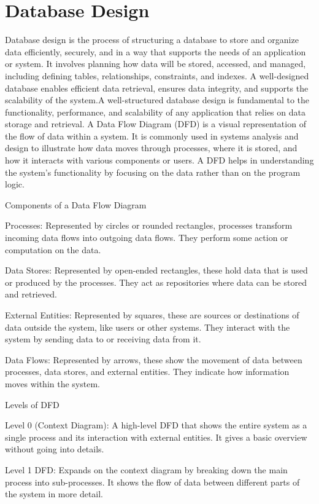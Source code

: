 \section{Database Design}
%
Database design is the process of structuring a database to store and organize data efficiently, securely, and in a way that supports the needs of an application or system. It involves planning how data will be stored, accessed, and managed, including defining tables, relationships, constraints, and indexes. A well-designed database enables efficient data retrieval, ensures data integrity, and supports the scalability of the system.A well-structured database design is fundamental to the functionality, performance, and scalability of any application that relies on data storage and retrieval.
A Data Flow Diagram (DFD) is a visual representation of the flow of data within a system. It is commonly used in systems analysis and design to illustrate how data moves through processes, where it is stored, and how it interacts with various components or users. A DFD helps in understanding the system's functionality by focusing on the data rather than on the program logic.

Components of a Data Flow Diagram

Processes: Represented by circles or rounded rectangles, processes transform incoming data flows into outgoing data flows. They perform some action or computation on the data.

Data Stores: Represented by open-ended rectangles, these hold data that is used or produced by the processes. They act as repositories where data can be stored and retrieved.

External Entities: Represented by squares, these are sources or destinations of data outside the system, like users or other systems. They interact with the system by sending data to or receiving data from it.

Data Flows: Represented by arrows, these show the movement of data between processes, data stores, and external entities. They indicate how information moves within the system.


Levels of DFD

Level 0 (Context Diagram): A high-level DFD that shows the entire system as a single process and its interaction with external entities. It gives a basic overview without going into details.

Level 1 DFD: Expands on the context diagram by breaking down the main process into sub-processes. It shows the flow of data between different parts of the system in more detail.

